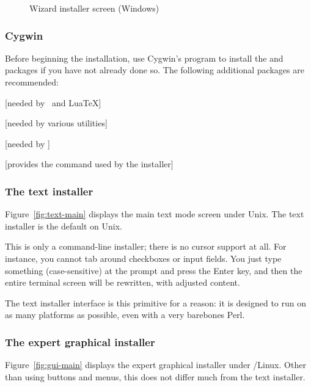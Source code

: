 \documentclass{article}
\begin{document}
\begin{figure}[tb]
\caption{Wizard installer screen (Windows)}\label{fig:wizard-w32}
\end{figure}


\subsubsection{Cygwin}
\label{sec:cygwin}

Before beginning the installation, use Cygwin's  program to
install the  and  packages if you have
not already done so.  The following additional packages are
recommended:
\begin{itemize*}
\item {} [needed by \XeTeX\ and Lua\TeX]
\item {} [needed by various utilities]
\item {} [needed by ]
\item {} [provides the  command used by the installer]
\end{itemize*}


\subsubsection{The text installer}

Figure~\ref{fig:text-main} displays the main text mode screen under
Unix.  The text installer is the default on Unix.

This is only a command-line installer; there is no cursor support at
all.  For instance, you cannot tab around checkboxes or input fields.
You just type something (case-sensitive) at the prompt and press the
Enter key, and then the entire terminal screen will be rewritten, with
adjusted content.

The text installer interface is this primitive for a reason: it
is designed to run on as many platforms as possible, even with a
very barebones Perl.

\subsubsection{The expert graphical installer}

Figure~\ref{fig:gui-main} displays the expert graphical installer under
\GNU/Linux.  Other than using buttons and menus, this does
not differ much from the text installer.
\end{document}
